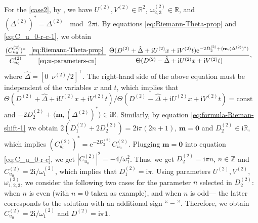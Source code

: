 \documentclass[11pt,reqno]{amsart}
\newcommand{\ii}{\mathrm{i}}
\newcommand{\ee}{\mathrm{e}}
\numberwithin{equation}{section}
\begin{document}
\begin{proof-solution-dn}
	For the \ref{case2}, by , we have $U^{(2)},V^{(2)}\in \mathbb{R}^2$, $\omega_{2,3}^{(2)}\in \mathbb{R}$, and $(\Delta^{(2)})^*=\Delta^{(2)} \, \mod \, 2\pi \ii$.
	By equations \eqref{eq:Riemann-Theta-prop} and \eqref{eq:C_u_0-r-c-1}, we obtain 
	\begin{equation}\nonumber
		\begin{split}
			\frac{(C_{u_0}^{(2)})^*}{C_{u_0}^{(2)}}\xlongequal[\eqref{eq:u-parameters-cn}]{\eqref{eq:Riemann-Theta-prop}}
%			
			&\ \frac{\Theta(D^{(2)}+\hat{\Delta}+\ii U^{(2)} x+\ii  V^{(2)} t)\ee^{-2D_2^{(2)}+\langle\mathbf{m},(\Delta^{(2)})^*\rangle}}{\Theta(D^{(2)}-\hat{\Delta}+\ii U^{(2)} x+\ii  V^{(2)} t)},
		\end{split}
	\end{equation}
	where $\hat{\Delta}=[0 \,\,\, \nu^{(2)}/2 ]^{\top}$.
	The right-hand side of the above equation must be independent of the variables $x$ and $t$, which implies that $\Theta(D^{(2)}+\hat{\Delta}+\ii U^{(2)} x+\ii  V^{(2)} t)/\Theta(D^{(2)}-\hat{\Delta}+\ii U^{(2)} x+\ii  V^{(2)} t)=\mathrm{const}$ and $-2D_2^{(2)}+\langle \mathbf{m}, (\Delta^{(2)})^* \rangle\in \ii \mathbb{R}$. Similarly, by equation \eqref{eq:formula-Rieman-shift-1} we obtain $2(D_1^{(2)}+2D_2^{(2)})=2\ii \pi (2n+1)$, $\mathbf{m}=\mathbf{0}$ and $D_2^{(2)}\in \ii \mathbb{R}$, which implies $(C_{u_0}^{(2)})^*=\ee^{-2D_2^{(2)}}C_{u_0}^{(2)}$.
	Plugging $\mathbf{m}=\mathbf{0}$ into equation \eqref{eq:C_u_0-r-c}, 
	we get $|C_{u_0}^{(2)}|^2=-4/\omega_1^2$.
	Thus, we get $D_2^{(2)}=\ii \pi n$, $n\in \mathbb{Z}$ and $C_{u_0}^{(2)}=2\ii /\omega_1^{(2)}$, which implies that $D_1^{(2)}=\ii \pi$.
	Using parameters $U^{(2)},V^{(2)}$, $\omega_{1,2,3}^{(2)}$, we consider the following two cases for the parameter $n$ selected in $D_2^{(2)}$: when $n$ is even (with $n=0$ taken as example), and when $n$ is odd--- the latter corresponds to the solution with an additional sign $``-"$.
	Therefore, we obtain $C_{u_0}^{(2)}=2\ii /\omega_1^{(2)}$ and $D^{(2)}=\ii \pi \mathbf{1}$. 
\end{proof-solution-dn}
\end{document}
